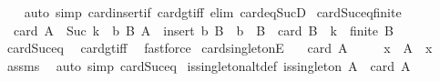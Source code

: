 \begin{isabellebody}
%
\isadelimproof
\ \ %
\endisadelimproof
%
\isatagproof
{}\isamarkupfalse%
\ {\isacharparenleft}{\kern0pt}auto\ simp{\isacharcolon}{\kern0pt}\ card{\isacharunderscore}{\kern0pt}insert{\isacharunderscore}{\kern0pt}if\ card{\isacharunderscore}{\kern0pt}gt{\isacharunderscore}{\kern0pt}{}{\isacharunderscore}{\kern0pt}iff\ elim{\isacharbang}{\kern0pt}{\isacharcolon}{\kern0pt}\ card{\isacharunderscore}{\kern0pt}eq{\isacharunderscore}{\kern0pt}SucD{\isacharparenright}{\kern0pt}%
\endisatagproof
{\isafoldproof}%
%
\isadelimproof
\isanewline
%
\endisadelimproof
\isanewline
{}\isamarkupfalse%
\ card{\isacharunderscore}{\kern0pt}Suc{\isacharunderscore}{\kern0pt}eq{\isacharunderscore}{\kern0pt}finite{\isacharcolon}{\kern0pt}\isanewline
\ \ {\isachardoublequoteopen}card\ A\ {\isacharequal}{\kern0pt}\ Suc\ k\ {\isasymlongleftrightarrow}\ {\isacharparenleft}{\kern0pt}{\isasymexists}b\ B{\isachardot}{\kern0pt}\ A\ {\isacharequal}{\kern0pt}\ insert\ b\ B\ {\isasymand}\ b\ {\isasymnotin}\ B\ {\isasymand}\ card\ B\ {\isacharequal}{\kern0pt}\ k\ {\isasymand}\ finite\ B{\isacharparenright}{\kern0pt}{\isachardoublequoteclose}\isanewline
%
\isadelimproof
\ \ %
\endisadelimproof
%
\isatagproof
{}\isamarkupfalse%
\ card{\isacharunderscore}{\kern0pt}Suc{\isacharunderscore}{\kern0pt}eq\ \isamarkupfalse%
\ card{\isacharunderscore}{\kern0pt}gt{\isacharunderscore}{\kern0pt}{}{\isacharunderscore}{\kern0pt}iff\ \isamarkupfalse%
\ fastforce%
\endisatagproof
{\isafoldproof}%
%
\isadelimproof
\isanewline
%
\endisadelimproof
\isanewline
{}\isamarkupfalse%
\ card{\isacharunderscore}{\kern0pt}{}{\isacharunderscore}{\kern0pt}singletonE{\isacharcolon}{\kern0pt}\isanewline
\ \ \ {\isachardoublequoteopen}card\ A\ {\isacharequal}{\kern0pt}\ {}{\isachardoublequoteclose}\isanewline
\ \ \ x\ \ {\isachardoublequoteopen}A\ {\isacharequal}{\kern0pt}\ {\isacharbraceleft}{\kern0pt}x{\isacharbraceright}{\kern0pt}{\isachardoublequoteclose}\isanewline
%
\isadelimproof
\ \ %
\endisadelimproof
%
\isatagproof
{}\isamarkupfalse%
\ assms\ \isamarkupfalse%
\ {\isacharparenleft}{\kern0pt}auto\ simp{\isacharcolon}{\kern0pt}\ card{\isacharunderscore}{\kern0pt}Suc{\isacharunderscore}{\kern0pt}eq{\isacharparenright}{\kern0pt}%
\endisatagproof
{\isafoldproof}%
%
\isadelimproof
\isanewline
%
\endisadelimproof
\isanewline
{}\isamarkupfalse%
\ is{\isacharunderscore}{\kern0pt}singleton{\isacharunderscore}{\kern0pt}altdef{\isacharcolon}{\kern0pt}\ {\isachardoublequoteopen}is{\isacharunderscore}{\kern0pt}singleton\ A\ {\isasymlongleftrightarrow}\ card\ A\ {\isacharequal}{\kern0pt}\ {}{\isachardoublequoteclose}\isanewline

\end{isabellebody}
